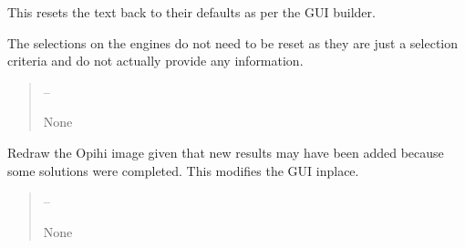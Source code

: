 \documentclass[letterpaper,11pt,english]{sphinxmanual}
\begin{document}
\begin{savenotes}
\begin{fulllineitems}
\begin{savenotes}
\begin{fulllineitems}
\sphinxAtStartPar
This resets the text back to their defaults as per the GUI builder.

\sphinxAtStartPar
The selections on the engines do not need to be reset as they are
just a selection criteria and do not actually provide any information.
\begin{quote}\begin{description}
\sphinxAtStartPar
{} – 

\sphinxAtStartPar
None

\end{description}\end{quote}

\end{fulllineitems}\end{savenotes}


\begin{savenotes}\begin{fulllineitems}
\label{\detokenize{code/opihiexarata.gui.manual:opihiexarata.gui.manual.OpihiManualWindow.redraw_opihi_image}}
\pysigstartsignatures
{}
\pysigstopsignatures
\sphinxAtStartPar
Redraw the Opihi image given that new results may have been added
because some solutions were completed. This modifies the GUI in\sphinxhyphen{}place.
\begin{quote}\begin{description}
\sphinxAtStartPar
{} – 

\sphinxAtStartPar
None

\end{description}\end{quote}

\end{fulllineitems}\end{savenotes}



\end{fulllineitems}
\end{savenotes}
\end{document}
